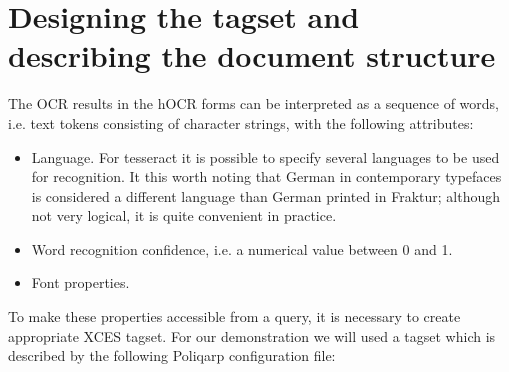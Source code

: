 \documentclass[runningheads,a4paper]{llncs}
\begin{document}
\section{Designing the tagset and describing the document structure}
\label{sec:design-tags-docum}

The OCR results in the hOCR forms can be interpreted as a sequence of
words, i.e. text tokens consisting of character strings, with the
following attributes:
\begin{itemize}
\item Language. For tesseract it is possible to specify several
  languages to be used for recognition. It this worth noting that
  German in contemporary typefaces is considered a different language
  than German printed in Fraktur; although not very logical, it is
  quite convenient in practice.
\item Word recognition confidence, i.e. a numerical value between 0
  and 1.
\item Font properties.
\end{itemize}

To make these properties accessible from a query, it is necessary to
create appropriate XCES tagset. For our demonstration we will used a
tagset which is described by the following Poliqarp configuration
file:



\end{document}
